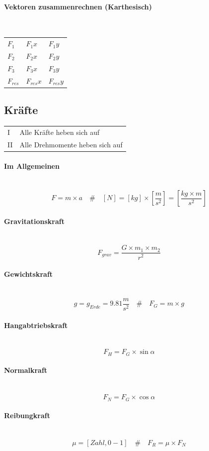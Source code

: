 \documentclass[a4paper,twoside,10pt]{article}
\newcommand{\lbparagraph}[1]{\paragraph{#1}\mbox{}\\}
\newcommand{\eqsp}[1]{\quad\#\quad}
\begin{document}
\lbparagraph{Vektoren zusammenrechnen (Karthesisch)}

\begin{tabular}{l|l|l}		
  $F_1$ & $F_1x$ & $F_1y$ \\			
  $F_2$ & $F_2x$ & $F_2y$ \\			
  $F_3$ & $F_3x$ & $F_3y$ \\
  \hline
  $F_{res}$ & $F_{res}x$ & $F_{res}y$ \\
\end{tabular}

\subsection{Kräfte}

\begin{tabular}{l|l}
    I & Alle Kräfte heben sich auf \\
    II & Alle Drehmomente heben sich auf
\end{tabular}

\lbparagraph{Im Allgemeinen}

\begin{equation}
    F = m \times a
    \eqsp{}
    [N] = [kg] \times [\frac{m}{s^2}] = [\frac{kg \times m}{s^2}]
\end{equation}

\lbparagraph{Gravitationskraft}

\begin{equation}
    F_{grav} = \frac{G \times m_1 \times m_2}{r^2}
\end{equation}

\lbparagraph{Gewichtskraft}

\begin{equation}
    g = g_{Erde} = 9.81\frac{m}{s^2}
    \eqsp{}
    F_G = m \times g
\end{equation}

\lbparagraph{Hangabtriebskraft}

\begin{equation}
    F_H = F_G \times{\sin{\alpha}}
\end{equation}

\lbparagraph{Normalkraft}

\begin{equation}
    F_N = F_G \times \cos{\alpha}
\end{equation}

\lbparagraph{Reibungkraft}

\begin{equation}
    \mu = [Zahl, 0 - 1]
    \eqsp{}
    F_R = \mu \times F_N
\end{equation}
\end{document}
